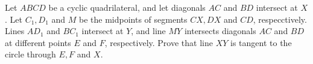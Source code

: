 Let $ABCD$ be a cyclic quadrilateral, and let diagonals $AC$ and $BD$ intersect at $X$. Let $C_1,D_1$ and $M$ be the midpoints of segments $CX,DX$ and $CD$, respecctively. Lines $AD_1$ and $BC_1$ intersect at $Y$, and line $MY$ intersects diagonals $AC$ and $BD$ at different points $E$ and $F$, respectively. Prove that line $XY$ is tangent to the circle through $E,F$ and $X$.